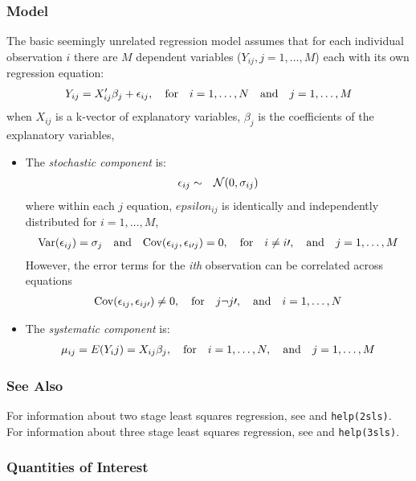 \documentclass[12pt]{book}%
\begin{document}
\subsubsection{Model}
The basic seemingly unrelated regression model assumes that for each individual
observation $i$ there are $M$ dependent variables ($Y_{ij}, j=1,\ldots,M$) 
each with its own regression equation:
\begin{eqnarray*}
Y_{ij} = X_{ij}'\beta_j + \epsilon_{ij}, \quad  {\rm for} \quad  i=1,\ldots,N \quad {\rm and} \quad  j=1,\ldots,M
\end{eqnarray*}
when $X_{ij}$ is a k-vector of explanatory variables, $\beta_j$
is the coefficients of the explanatory variables,
\begin{itemize}
\item The \emph{stochastic component} is:
\begin{eqnarray*}
\epsilon_{ij}  &  \sim & {\cal N}(0, \sigma_{ij})
\end{eqnarray*}
where within each $j$ equation, $epsilon_{ij}$ is identically
and independently distributed for $i=1,\ldots,M$,
\begin{eqnarray*}
{\rm Var}(\epsilon_{ij})=\sigma_j \quad {\rm and} \quad {\rm Cov}(\epsilon_{ij}, \epsilon_{i\prime j})= 0, \quad {\rm for} \quad i \neq i\prime,\quad {\rm and} \quad j=1,\ldots,M 
\end{eqnarray*}
However, the error terms for the \emph{ith} observation can be correlated across equations
\begin{eqnarray*}
{\rm Cov}(\epsilon_{ij}, \epsilon_{ij\prime})\neq 0, \quad {\rm for} \quad j \neg j\prime, \quad {\rm and} \quad i=1,\ldots,N 
\end{eqnarray*}
\item The \emph{systematic component} is:
\begin{eqnarray*}
\mu_{ij}= E(Y_ij)= X_{ij}\beta_j, \quad {\rm for} \quad  i=1,\ldots,N, \quad {\rm and} \quad j=1,\ldots,M 
\end{eqnarray*}
\end{itemize}
\subsubsection{See Also}
For information about two stage least squares regression, see 
 and \texttt{help(2sls)}.
For information about three stage least squares regression, see
 and \texttt{help(3sls)}.
\subsubsection{Quantities of Interest}
\end{document}
